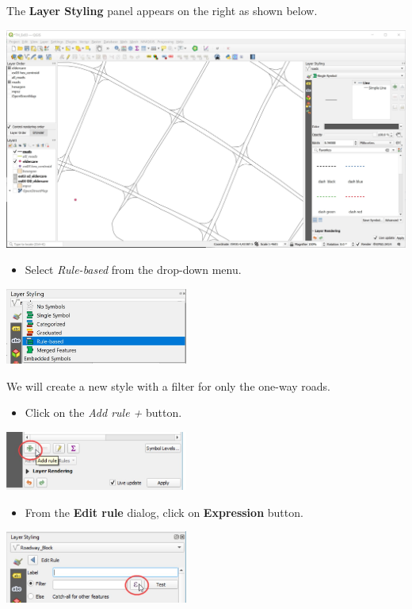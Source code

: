 \documentclass[
  letterpaper,
  DIV=11,
  numbers=noendperiod]{scrreprt}
\providecommand{\tightlist}{%
  \setlength{\itemsep}{0pt}\setlength{\parskip}{0pt}}\usepackage{longtable,booktabs,array}
\begin{document}
The \textbf{Layer Styling} panel appears on the right as shown below.

\includegraphics{./img09/image8.jpg}

\begin{itemize}
\tightlist
\item
  Select \emph{Rule-based} from the drop-down menu.
\end{itemize}

\includegraphics[width=0.45\textwidth,height=\textheight]{./img09/image9.jpg}

We will create a new style with a filter for only the one-way roads.

\begin{itemize}
\tightlist
\item
  Click on the \emph{Add rule +} button.
\end{itemize}

\includegraphics[width=0.45\textwidth,height=\textheight]{./img09/image10.jpg}

\begin{itemize}
\tightlist
\item
  From the \textbf{Edit rule} dialog, click on \textbf{Expression}
  button.
\end{itemize}

\includegraphics[width=0.45\textwidth,height=\textheight]{./img09/image11.jpg}
\end{document}

